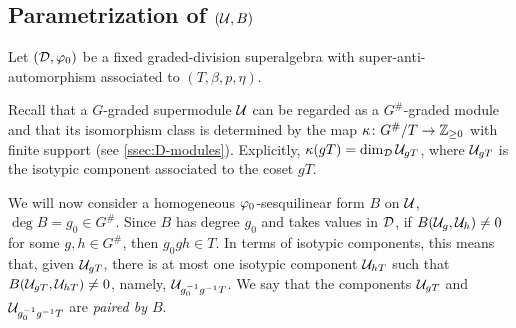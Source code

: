 \subsection{Parametrization of \texorpdfstring{$(\mathcal U, B)$}{(U, B)}}


Let $(\mathcal{D}, \varphi_0)$ be a fixed graded-division superalgebra with super-anti-automorphism associated to $(T, \beta, p, \eta)$.

Recall that a $G$-graded supermodule $\mathcal U$ can be regarded as a $G^\#$-graded module
and that its isomorphism class is determined by the map $\kappa\colon G^\#/T \to \mathbb{Z}_{\geq 0}$ with finite support (see \cref{ssec:D-modules}).
Explicitly, $\kappa (gT) = \dim_{\mathcal{D}} \mathcal U_{gT}$, where $\mathcal U_{gT}$ is the isotypic component associated to the coset $gT$.


We will now consider a
homogeneous $\varphi_0$-sesquilinear form $B$ on $\mathcal U$, $\deg B = g_0 \in G^\#$.
Since $B$ has degree $g_0$ and takes values in $\mathcal{D}$, if $B(\mathcal U_{g}, \mathcal U_{h}) \neq 0$ for some $g, h \in G^\#$, then $g_0 g h \in T$.
In terms of isotypic components, this means that, given $\mathcal U_{g T}$, there is at most one isotypic component $\mathcal U_{hT}$ such that $B(\mathcal U_{gT}, \mathcal U_{hT}) \neq 0$, namely, $\mathcal U_{g_0^{-1} g^{-1} T}$.
We say that the components $\mathcal U_{gT}$ and $\mathcal U_{g_0^{-1} g^{-1} T}$ are \emph{paired by $B$}.

